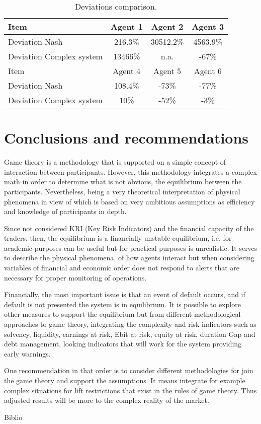 \documentclass[12pt]{book}
\begin{document}
\begin{table}[htbp]
\begin{center}
\begin{tabular}{| l | c | c | c |}
\hline
Item & Agent 1 & Agent 2 & Agent 3 \\
\hline \hline
Deviation Nash & 216.3\%& 30512.2\% & 4563.9\% \\ \hline
Deviation Complex system & 13466\% & n.a. & -67\%  \\ \hline
\hline
Item & Agent 4 & Agent 5 & Agent 6  \\
\hline \hline
Deviation Nash  & 108.4\% & -73\% & -77\% \\ \hline
Deviation Complex system & 10\% & -52\%& -3\% \\ \hline
\end{tabular}
\caption{Deviations comparison.}
\label{table 3}
\end{center}
\end{table}

\section{Conclusions and recommendations}

Game theory is a methodology that is supported on a simple concept of interaction between participants. However, this methodology integrates a complex math in order to determine what is not obvious, the equilibrium between the participants. Nevertheless, being a very theoretical interpretation of physical phenomena in view of which is based on very ambitious assumptions as efficiency and knowledge of participants in depth. 

Since not considered KRI (Key Risk Indicators) and the financial capacity of the traders, then, the equilibrium is a financially unstable equilibrium, i.e. for academic purposes can be useful but for practical purposes is unrealistic. It serves to describe the physical phenomena, of how agents interact but when considering variables of financial and economic order does not respond to alerts that are necessary for proper monitoring of operations. 

Financially, the most important issue is that an event of default occurs, and if default is not presented the system is in equilibrium. It is possible to explore other measures to support the equilibrium but from different methodological approaches to game theory, integrating the complexity and risk indicators such as solvency, liquidity, earnings at risk, Ebit at risk, equity at risk, duration Gap and debt management, looking indicators that will work for the system providing early warnings. 

One recommendation in that order is to consider different methodologies for join the game theory and support the assumptions. It means integrate for example complex situations for lift restrictions that exist in the rules of game theory. Thus adjusted results will be more to the complex reality of the market.


 {Biblio}

\end{document}
